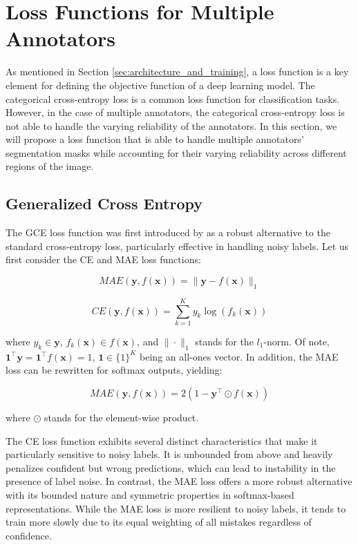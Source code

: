 \section{Loss Functions for Multiple
Annotators}\label{sec:proposed-loss-functions}

As mentioned in Section \ref{sec:architecture_and_training}, a loss
function is a key element for defining the objective function of a
deep learning model. The categorical cross-entropy loss is a common
loss function for classification tasks. However, in the case of
multiple annotators, the categorical cross-entropy loss is not able
to handle the varying reliability of the annotators. In this section,
we will propose a loss function that is able to handle multiple
annotators' segmentation masks while accounting for their varying reliability
across different regions of the image.

\subsection{Generalized Cross Entropy}

The \gls{GCE} loss function was first introduced by
\cite{ZhangEtAl2018} as a robust alternative to the standard
cross-entropy loss, particularly effective in handling noisy labels.
Let us first consider the \gls{CE} and \gls{MAE} loss functions:

\begin{equation}
  MAE(\mathbf{y}, f(\mathbf{x})) = \|\mathbf{y} - f(\mathbf{x})\|_1
\end{equation}

\begin{equation}
  CE(\mathbf{y}, f(\mathbf{x})) = \sum_{k=1}^K y_k \log(f_k(\mathbf{x}))
\end{equation}

where $y_k \in \mathbf{y}$, $f_k(\mathbf{x}) \in f(\mathbf{x})$, and
$\|\cdot\|_1$ stands for the $l_1$-norm. Of note,
$\mathbf{1}^\top\mathbf{y} = \mathbf{1}^\top f(\mathbf{x}) = 1$,
$\mathbf{1} \in \{1\}^K$ being an all-ones vector. In addition, the
MAE loss can be rewritten for softmax outputs, yielding:

\begin{equation}
  MAE(\mathbf{y}, f(\mathbf{x})) = 2(1 - \mathbf{y}^\top
  \odot f(\mathbf{x}))
\end{equation}

where $\odot$ stands for the element-wise product.

The \gls{CE} loss function exhibits several distinct characteristics
that make it particularly sensitive to noisy labels. It is unbounded
from above and heavily penalizes confident but wrong predictions,
which can lead to instability in the presence of label noise. In
contrast, the \gls{MAE} loss offers a more robust alternative with
its bounded nature and symmetric properties in softmax-based
representations. While the MAE loss is more resilient to noisy
labels, it tends to train more slowly due to its equal weighting of
all mistakes regardless of confidence.

